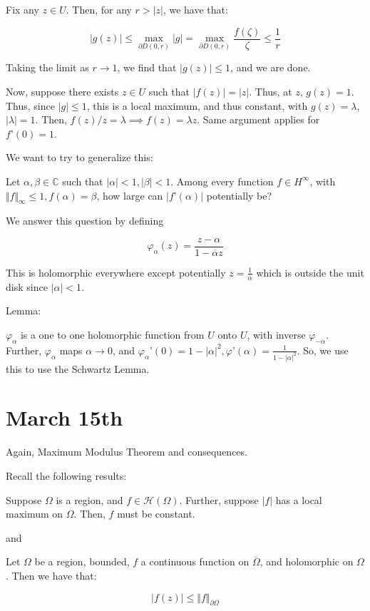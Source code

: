 \documentclass[10pt]{article}
\newcommand{\calH}{\mathcal{H}}
\begin{document}
Fix any $z \in U$. Then, for any $r > |z|$, we have that:

$$ |g(z)| \leq \max_{\partial D(0,r)} |g| = \max_{\partial D(0,r)} \frac{f(\zeta)}{\zeta} \leq \frac{1}{r} $$ 

Taking the limit as $r \to 1$, we find that $|g(z)| \leq 1$, and we are done.

Now, suppose there exists $z \in U$ such that $|f(z)| = |z|$. Thus, at $z$, $g(z) = 1$. Thus, since $|g| \leq 1$, this is a local maximum, and thus constant, with $g(z) = \lambda$, $|\lambda| = 1$. Then, $f(z)/z = \lambda \implies f(z) = \lambda z$. Same argument applies for $f’(0) =1$.

We want to try to generalize this:

Let $\alpha, \beta \in \mathbb{C}$ such that $|\alpha| <1, |\beta| < 1$. Among every function $f \in H^\infty$, with $\Vert f \Vert_\infty \leq 1, f(\alpha) = \beta$, how large can $|f’(\alpha)|$ potentially be?

We answer this question by defining 

$$\varphi_\alpha(z) = \frac{z - \alpha}{1 - \overline{\alpha} z} $$

This is holomorphic everywhere except potentially $z = \frac{1}{\overline{\alpha}}$ which is outside the unit disk since $|\alpha| < 1$.

Lemma:

$ \varphi_\alpha$ is a one to one holomorphic function from $U$ onto $U$, with inverse $\varphi_{-\alpha}$. Further, $\varphi_\alpha$ maps $\alpha \to 0$, and $\varphi_\alpha’(0) = 1 - |\alpha|^2, \varphi’(\alpha) = \frac{1}{1 - |\alpha|^2}$. So, we use this to use the Schwartz Lemma.

\section*{March 15th}

Again, Maximum Modulus Theorem and consequences.

Recall the following results:

Suppose $\Omega$ is a region, and $f \in \calH(\Omega)$. Further, suppose $|f|$ has a local maximum on $\Omega$. Then, $f$ must be constant.

and

Let $\Omega$ be a region, bounded, $f$ a continuous function on $\overline{\Omega}$, and holomorphic on $\Omega$. Then we have that:

$$ |f(z)| \leq \Vert f \Vert_{\partial \Omega} $$
\end{document}
